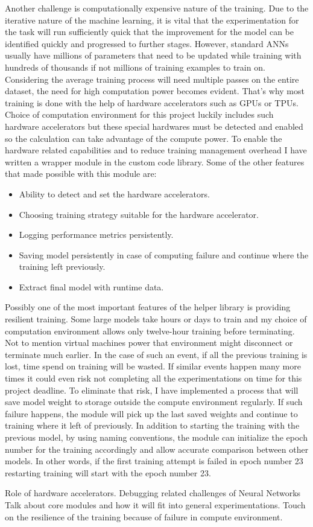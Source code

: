 Another challenge is computationally expensive nature of the training.
Due to the iterative nature of the machine learning, it is vital that the experimentation for the task will run sufficiently quick that the improvement for the model can be identified quickly and progressed to further stages. 
However, standard ANNs usually have millions of parameters that need to be updated while training with hundreds of thousands if not millions of training examples to train on. 
Considering the average training process will need multiple passes on the entire dataset, the need for high computation power becomes evident.
That's why most training is done with the help of hardware accelerators such as GPUs or TPUs.
Choice of computation environment for this project luckily includes such hardware accelerators but these special hardwares must be detected and enabled so the calculation can take advantage of the compute power.
To enable the hardware related capabilities and to reduce training management overhead I have written a wrapper module in the custom code library.
Some of the other features that made possible with this module are:

\begin{itemize}
  \item Ability to detect and set the hardware accelerators.
  \item Choosing training strategy suitable for the hardware accelerator.
  \item Logging performance metrics persistently.
  \item Saving model persistently in case of computing failure and continue where the training left previously.
  \item Extract final model with runtime data.
\end{itemize}
 
Possibly one of the most important features of the helper library is providing resilient training. 
Some large models take hours or days to train and my choice of computation environment allows only twelve-hour training before terminating. 
Not to mention virtual machines power that environment might disconnect or terminate much earlier. 
In the case of such an event, if all the previous training is lost, time spend on training will be wasted. 
If similar events happen many more times it could even risk not completing all the experimentations on time for this project deadline. 
To eliminate that risk, I have implemented a process that will save model weight to storage outside the compute environment regularly. 
If such failure happens, the module will pick up the last saved weights and continue to training where it left of previously.
In addition to starting the training with the previous model, by using naming conventions, the module can initialize the epoch number for the training accordingly and allow accurate comparison between other models. 
In other words, if the first training attempt is failed in epoch number 23 restarting training will start with the epoch number 23.




Role of hardware accelerators. Debugging related challenges of Neural Networks
Talk about core modules and how it will fit into general experimentations. 
Touch on the resilience of the training because of failure in compute environment.
\clearpage